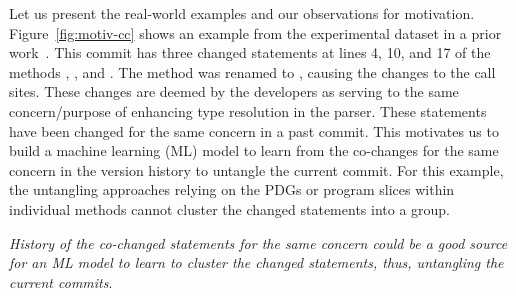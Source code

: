 
Let us present the real-world examples and our observations for
motivation. Figure~\ref{fig:motiv-cc} shows an example from the
experimental dataset in a prior work~\cite{flexeme-fse20}. This commit
has three changed statements at lines 4, 10, and 17 of the methods
, , and .  The
method  was renamed to
, causing the changes to the call sites.
These changes are deemed by the developers as serving to the same
concern/purpose of enhancing type resolution in the parser.  These
statements have been changed for the same concern in a past
commit. This motivates us to build a machine learning (ML) model to
learn from the co-changes for the same concern in the version history
to untangle the current commit. For this example, the untangling
approaches relying on the PDGs or program slices within individual
methods cannot cluster the changed statements into a group.


 {\em
  History of the co-changed statements for the same concern could be a
  good source for an ML model to learn to cluster the changed statements, thus,
  untangling the current commits}.

